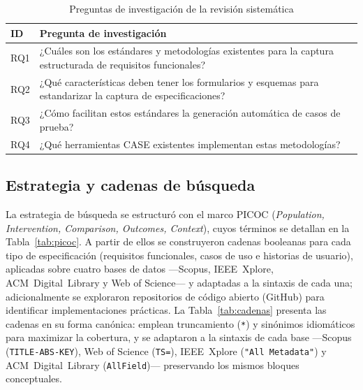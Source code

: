 \documentclass[10pt,journal,twoside,letterpaper]{IEEEtran}
\begin{document}
	\begin{table}[!t]
		\caption{Preguntas de investigación de la revisión sistemática}
		\label{tab:rqs}
		\centering
		\small
		\begin{tabular}{@{}p{}p{}@{}}
			\toprule
			\textbf{ID} & \textbf{Pregunta de investigación} \\
			\midrule
			RQ1 & ¿Cuáles son los estándares y metodologías existentes para la captura estructurada de requisitos funcionales? \\
			RQ2 & ¿Qué características deben tener los formularios y esquemas para estandarizar la captura de especificaciones? \\
			RQ3 & ¿Cómo facilitan estos estándares la generación automática de casos de prueba? \\
			RQ4 & ¿Qué herramientas CASE existentes implementan estas metodologías? \\
			\bottomrule
		\end{tabular}
	\end{table}
	
	\subsection{Estrategia y cadenas de búsqueda}
	\label{subsec:busqueda}
	
	La estrategia de búsqueda se estructuró con el marco PICOC (\emph{Population, Intervention, Comparison, Outcomes, Context}), cuyos términos se detallan en la Tabla~\ref{tab:picoc}. A partir de ellos se construyeron cadenas booleanas para cada tipo de especificación (requisitos funcionales, casos de uso e historias de usuario), aplicadas sobre cuatro bases de datos ---Scopus, IEEE~Xplore, ACM~Digital~Library y Web of Science--- y adaptadas a la sintaxis de cada una; adicionalmente se exploraron repositorios de código abierto (GitHub) para identificar implementaciones prácticas. La Tabla~\ref{tab:cadenas} presenta las cadenas en su forma canónica: emplean truncamiento (\texttt{*}) y sinónimos idiomáticos para maximizar la cobertura, y se adaptaron a la sintaxis de cada base ---Scopus (\texttt{TITLE-ABS-KEY}), Web of Science (\texttt{TS=}), IEEE~Xplore (\texttt{"All Metadata"}) y ACM~Digital~Library (\texttt{AllField})--- preservando los mismos bloques conceptuales.
	
\end{document}
